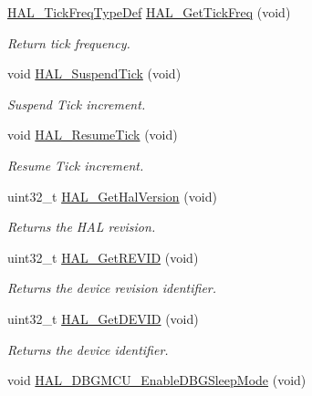 \begin{DoxyCompactItemize}
\hyperlink{group___h_a_l___t_i_c_k___f_r_e_q_gab36ec81674817249c46734772ff3b73a}{H\+A\+L\+\_\+\+Tick\+Freq\+Type\+Def} \hyperlink{group___h_a_l___exported___functions___group2_ga803cdbcc0883bcf5f5c98c50024c97e6}{H\+A\+L\+\_\+\+Get\+Tick\+Freq} (void)
\begin{DoxyCompactList}\small\item\em Return tick frequency. \end{DoxyCompactList}\item 
void \hyperlink{group___h_a_l___exported___functions___group2_ga84ae4b045c45d49d96b2b02e2dc516b6}{H\+A\+L\+\_\+\+Suspend\+Tick} (void)
\begin{DoxyCompactList}\small\item\em Suspend Tick increment. \end{DoxyCompactList}\item 
void \hyperlink{group___h_a_l___exported___functions___group2_gac3fa17aa85e357e3f1af56ad110d2e97}{H\+A\+L\+\_\+\+Resume\+Tick} (void)
\begin{DoxyCompactList}\small\item\em Resume Tick increment. \end{DoxyCompactList}\item 
uint32\+\_\+t \hyperlink{group___h_a_l___exported___functions___group2_gafb139b375512ad2a234e4619b129b966}{H\+A\+L\+\_\+\+Get\+Hal\+Version} (void)
\begin{DoxyCompactList}\small\item\em Returns the H\+AL revision. \end{DoxyCompactList}\item 
uint32\+\_\+t \hyperlink{group___h_a_l___exported___functions___group2_gae051ef9e932404b21f5877c7186406b8}{H\+A\+L\+\_\+\+Get\+R\+E\+V\+ID} (void)
\begin{DoxyCompactList}\small\item\em Returns the device revision identifier. \end{DoxyCompactList}\item 
uint32\+\_\+t \hyperlink{group___h_a_l___exported___functions___group2_gaff785f069ed650de77ff82ac407f7c84}{H\+A\+L\+\_\+\+Get\+D\+E\+V\+ID} (void)
\begin{DoxyCompactList}\small\item\em Returns the device identifier. \end{DoxyCompactList}\item 
void \hyperlink{group___h_a_l___exported___functions___group2_gaf031bcc71ebad9b7edf405547efd762b}{H\+A\+L\+\_\+\+D\+B\+G\+M\+C\+U\+\_\+\+Enable\+D\+B\+G\+Sleep\+Mode} (void)

\end{DoxyCompactItemize}
